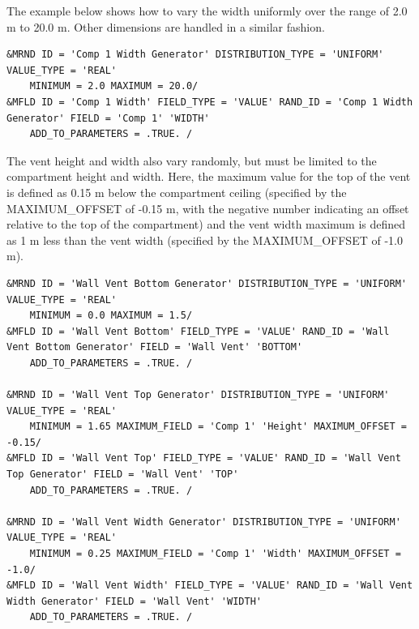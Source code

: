 \documentclass[12pt,twoside]{book}
\begin{document}
The example below shows how to vary the width uniformly over the range of 2.0 m to 20.0 m. Other dimensions are handled in a similar fashion.

\vspace{\baselineskip}
\begin{lstlisting}
&MRND ID = 'Comp 1 Width Generator' DISTRIBUTION_TYPE = 'UNIFORM' VALUE_TYPE = 'REAL'
    MINIMUM = 2.0 MAXIMUM = 20.0/
&MFLD ID = 'Comp 1 Width' FIELD_TYPE = 'VALUE' RAND_ID = 'Comp 1 Width Generator' FIELD = 'Comp 1' 'WIDTH'
    ADD_TO_PARAMETERS = .TRUE. /
\end{lstlisting}

The vent height and width also vary randomly, but must be limited to the compartment height and width. Here, the maximum value for the top of the vent is defined as 0.15 m below the compartment ceiling (specified by the {\ct MAXIMUM\_OFFSET} of -0.15 m, with the negative number indicating an offset relative to the top of the compartment) and the vent width maximum is defined as 1 m less than the vent width (specified by the {\ct MAXIMUM\_OFFSET} of -1.0 m).

\vspace{\baselineskip}
\begin{lstlisting}
&MRND ID = 'Wall Vent Bottom Generator' DISTRIBUTION_TYPE = 'UNIFORM' VALUE_TYPE = 'REAL'
    MINIMUM = 0.0 MAXIMUM = 1.5/
&MFLD ID = 'Wall Vent Bottom' FIELD_TYPE = 'VALUE' RAND_ID = 'Wall Vent Bottom Generator' FIELD = 'Wall Vent' 'BOTTOM'
    ADD_TO_PARAMETERS = .TRUE. /

&MRND ID = 'Wall Vent Top Generator' DISTRIBUTION_TYPE = 'UNIFORM' VALUE_TYPE = 'REAL'
    MINIMUM = 1.65 MAXIMUM_FIELD = 'Comp 1' 'Height' MAXIMUM_OFFSET = -0.15/
&MFLD ID = 'Wall Vent Top' FIELD_TYPE = 'VALUE' RAND_ID = 'Wall Vent Top Generator' FIELD = 'Wall Vent' 'TOP'
    ADD_TO_PARAMETERS = .TRUE. /

&MRND ID = 'Wall Vent Width Generator' DISTRIBUTION_TYPE = 'UNIFORM' VALUE_TYPE = 'REAL'
    MINIMUM = 0.25 MAXIMUM_FIELD = 'Comp 1' 'Width' MAXIMUM_OFFSET = -1.0/
&MFLD ID = 'Wall Vent Width' FIELD_TYPE = 'VALUE' RAND_ID = 'Wall Vent Width Generator' FIELD = 'Wall Vent' 'WIDTH'
    ADD_TO_PARAMETERS = .TRUE. /
\end{lstlisting}
\end{document}

